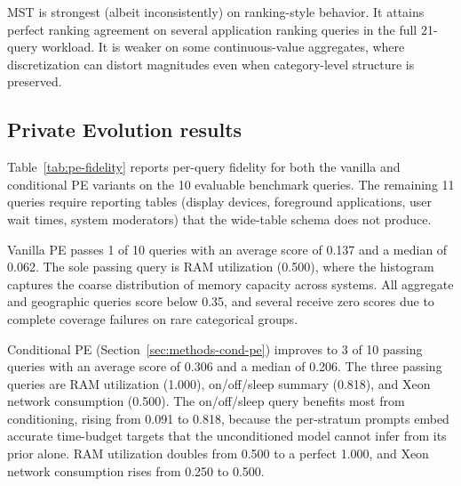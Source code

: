 \documentclass[12pt,letterpaper]{article}
\renewcommand{\_}{\textunderscore\allowbreak}
\begin{document}
MST is strongest (albeit inconsistently) on ranking-style behavior. It attains perfect ranking agreement on several application ranking queries in the full 21-query workload. It is weaker on some continuous-value aggregates, where discretization can distort magnitudes even when category-level structure is preserved.

\subsection{Private Evolution results}

Table~\ref{tab:pe-fidelity} reports per-query fidelity for both the vanilla and conditional PE variants on the 10 evaluable benchmark queries. The remaining 11 queries require reporting tables (display devices, foreground applications, user wait times, system moderators) that the wide-table schema does not produce.

Vanilla PE passes 1 of 10 queries with an average score of 0.137 and a median of 0.062. The sole passing query is RAM utilization (0.500), where the histogram captures the coarse distribution of memory capacity across systems. All aggregate and geographic queries score below 0.35, and several receive zero scores due to complete coverage failures on rare categorical groups.

Conditional PE (Section~\ref{sec:methods-cond-pe}) improves to 3 of 10 passing queries with an average score of 0.306 and a median of 0.206. The three passing queries are RAM utilization (1.000), on/off/sleep summary (0.818), and Xeon network consumption (0.500). The on/off/sleep query benefits most from conditioning, rising from 0.091 to 0.818, because the per-stratum prompts embed accurate time-budget targets that the unconditioned model cannot infer from its prior alone. RAM utilization doubles from 0.500 to a perfect 1.000, and Xeon network consumption rises from 0.250 to 0.500.
\end{document}
